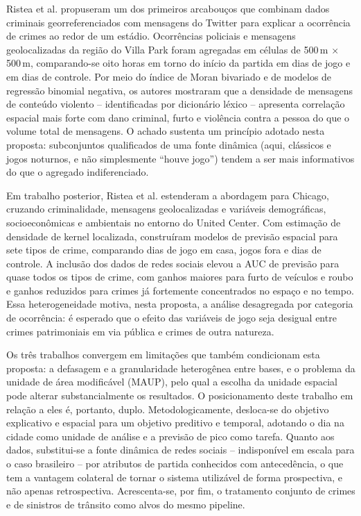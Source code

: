 \documentclass[12pt]{article}
\begin{document}
Ristea et al. \cite{ristea2018} propuseram um dos primeiros arcabouços que
combinam dados criminais georreferenciados com mensagens do Twitter para
explicar a ocorrência de crimes ao redor de um estádio. Ocorrências policiais e
mensagens geolocalizadas da região do Villa Park foram agregadas em células de
500\,m $\times$ 500\,m, comparando-se oito horas em torno do início da partida
em dias de jogo e em dias de controle. Por meio do índice de Moran bivariado e
de modelos de regressão binomial negativa, os autores mostraram que a densidade
de mensagens de conteúdo violento -- identificadas por dicionário léxico --
apresenta correlação espacial mais forte com dano criminal, furto e violência
contra a pessoa do que o volume total de mensagens. O achado sustenta um
princípio adotado nesta proposta: subconjuntos qualificados de uma fonte
dinâmica (aqui, clássicos e jogos noturnos, e não simplesmente ``houve jogo'')
tendem a ser mais informativos do que o agregado indiferenciado.

Em trabalho posterior, Ristea et al. \cite{ristea2020} estenderam a abordagem
para Chicago, cruzando criminalidade, mensagens geolocalizadas e variáveis
demográficas, socioeconômicas e ambientais no entorno do United Center. Com
estimação de densidade de kernel localizada, construíram modelos de previsão
espacial para sete tipos de crime, comparando dias de jogo em casa, jogos fora
e dias de controle. A inclusão dos dados de redes sociais elevou a AUC de
previsão para quase todos os tipos de crime, com ganhos maiores para furto de
veículos e roubo e ganhos reduzidos para crimes já fortemente concentrados no
espaço e no tempo. Essa heterogeneidade motiva, nesta proposta, a análise
desagregada por categoria de ocorrência: é esperado que o efeito das variáveis
de jogo seja desigual entre crimes patrimoniais em via pública e crimes de
outra natureza.

Os três trabalhos convergem em limitações que também condicionam esta proposta:
a defasagem e a granularidade heterogênea entre bases, e o problema da unidade
de área modificável (MAUP), pelo qual a escolha da unidade espacial pode
alterar substancialmente os resultados. O posicionamento deste trabalho em
relação a eles é, portanto, duplo. Metodologicamente, desloca-se do objetivo
explicativo e espacial para um objetivo preditivo e temporal, adotando o dia na
cidade como unidade de análise e a previsão de pico como tarefa. Quanto aos
dados, substitui-se a fonte dinâmica de redes sociais -- indisponível em escala
para o caso brasileiro -- por atributos de partida conhecidos com antecedência,
o que tem a vantagem colateral de tornar o sistema utilizável de forma
prospectiva, e não apenas retrospectiva. Acrescenta-se, por fim, o tratamento
conjunto de crimes e de sinistros de trânsito como alvos do mesmo pipeline.
\end{document}
